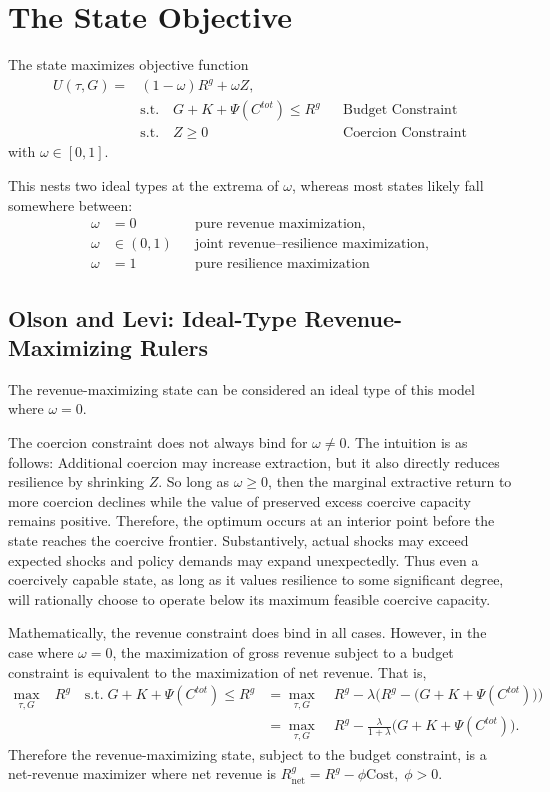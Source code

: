 \documentclass[12pt]{article}
\begin{document}
\section{The State Objective}

The state maximizes objective function
\begin{align}
U(\tau,G) =& (1-\omega)R^g + \omega Z, \\
& \text{s.t.} \quad G + K + \Psi(C^{tot}) \le R^g && \text{Budget Constraint} \\
& \text{s.t.} \quad Z \ge 0 && \text{Coercion Constraint}
\label{eq:jointobj}
\end{align}
with $\omega \in [0,1]$.

This nests two ideal types at the extrema of $\omega$, whereas most states likely fall somewhere between:
\begin{align*}
\omega &= 0 && \text{pure revenue maximization},\\
\omega &\in (0,1) && \text{joint revenue--resilience maximization}, \\
\omega &= 1 && \text{pure resilience maximization}
\end{align*}

\subsection{Olson and Levi: Ideal-Type Revenue-Maximizing Rulers}

The revenue-maximizing state can be considered an ideal type of this model where $\omega = 0$.

The coercion constraint does not always bind for $\omega \neq 0$. The intuition is as follows: Additional coercion may increase extraction, but it also directly reduces resilience by shrinking $Z$. So long as $\omega \ge 0$, then the marginal extractive return to more coercion declines while the value of preserved excess coercive capacity remains positive. Therefore, the optimum occurs at an interior point before the state reaches the coercive frontier. Substantively, actual shocks may exceed expected shocks and policy demands may expand unexpectedly. Thus even a coercively capable state, as long as it values resilience to some significant degree, will rationally choose to operate below its maximum feasible coercive capacity.

Mathematically, the revenue constraint does bind in all cases. However, in the case where $\omega = 0$, the maximization of gross revenue subject to a budget constraint is equivalent to the maximization of net revenue. That is,
\begin{align*}
    \max_{\tau, G} \;& R^g \quad \text{s.t.} \; G + K + \Psi(C^{tot}) \le R^g &=
    \max_{\tau, G} \;& R^g - \lambda \Big(R^g - \big(G + K + \Psi(C^{tot})\big)\Big) \\
    &&= \max_{\tau, G} \;& R^g - \frac{\lambda}{1+\lambda}\big(G + K + \Psi(C^{tot})\big).
\end{align*}
Therefore the revenue-maximizing state, subject to the budget constraint, is a net-revenue maximizer where net revenue is $R^g_{\text{net}} = R^g - \phi \text{Cost}, \; \phi > 0$.
\end{document}
